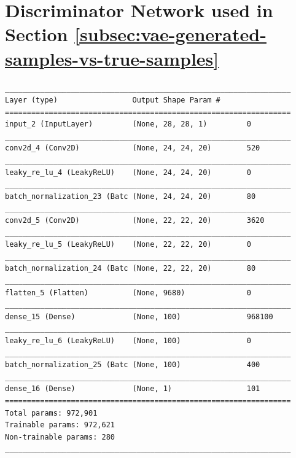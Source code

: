\documentclass[11pt]{article}
\newcounter{savepage}
\begin{document}
\section{Discriminator Network used in Section \ref{subsec:vae-generated-samples-vs-true-samples}}\label{sec:listing_discriminator_network}
\begin{lstlisting}[caption={The discriminator network used to distinguish generated \ac{VAE}/\ac{VLAE} samples from true \textsc{MNIST} images.},captionpos=b]
_________________________________________________________________
Layer (type)                 Output Shape Param #
=================================================================
input_2 (InputLayer)         (None, 28, 28, 1)         0
_________________________________________________________________
conv2d_4 (Conv2D)            (None, 24, 24, 20)        520
_________________________________________________________________
leaky_re_lu_4 (LeakyReLU)    (None, 24, 24, 20)        0
_________________________________________________________________
batch_normalization_23 (Batc (None, 24, 24, 20)        80
_________________________________________________________________
conv2d_5 (Conv2D)            (None, 22, 22, 20)        3620
_________________________________________________________________
leaky_re_lu_5 (LeakyReLU)    (None, 22, 22, 20)        0
_________________________________________________________________
batch_normalization_24 (Batc (None, 22, 22, 20)        80
_________________________________________________________________
flatten_5 (Flatten)          (None, 9680)              0
_________________________________________________________________
dense_15 (Dense)             (None, 100)               968100
_________________________________________________________________
leaky_re_lu_6 (LeakyReLU)    (None, 100)               0
_________________________________________________________________
batch_normalization_25 (Batc (None, 100)               400
_________________________________________________________________
dense_16 (Dense)             (None, 1)                 101
=================================================================
Total params: 972,901
Trainable params: 972,621
Non-trainable params: 280
_________________________________________________________________
\end{lstlisting}


\newpage
{}
\setcounter{page}{\thesavepage}
\end{document}
